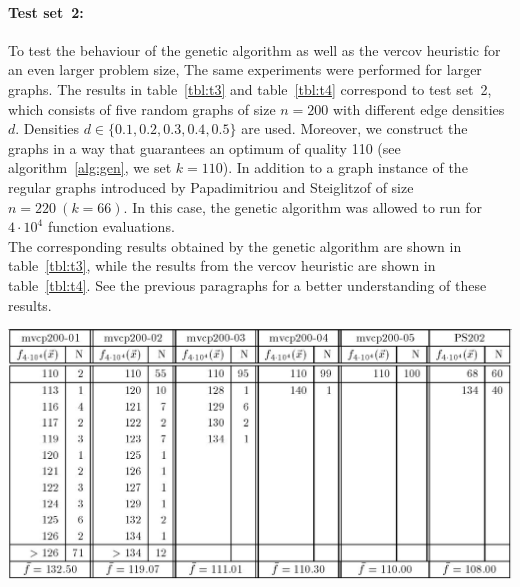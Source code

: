 \documentclass[12pt]{article}
\begin{document}
\paragraph{Test set~2:}
To test the behaviour of the genetic algorithm
as well as the vercov heuristic for an even
larger problem size, The same experiments
were performed for larger graphs.
The results in table~\ref{tbl:t3}
and table~\ref{tbl:t4} correspond to test set~2,
which consists of five random graphs of size
$n = 200$ with different edge densities $d$.
Densities $d \in \{0.1, 0.2, 0.3, 0.4, 0.5\}$ are used.
Moreover, we construct the graphs in a way that guarantees an optimum of quality 110
(see algorithm~\ref{alg:gen}, we set $k = 110$).
In addition to a graph instance of the regular graphs introduced by
Papadimitriou and Steiglitzof of size $n = 220 \ (k=66)$.
In this case, the genetic algorithm
was allowed to run for $4 \cdot 10^4$ function evaluations.\\
The corresponding results obtained by the
genetic algorithm are shown in table~\ref{tbl:t3}, while the results
from the vercov heuristic are shown in table~\ref{tbl:t4}.
See the previous paragraphs for a better understanding of these results.

\begin{table}[!htbp]
\centering
\includegraphics[width=1\textwidth]{t3}
\caption[Results obtained by GA for graphs in test set~2]{%
Experimental results obtained by the genetic algorithm for five random graphs of size $n = 200$ with edge density: $d = 0.1$ (``mvcp200-01''), $d = 0.2$ (``mvcp200-02''), $d = 0.3$ (``mvcp200-03''), $d = 0.5$ (``mvcp200-04''), $d = 0.5$ (``mvcp200-05'') and the regular graph of size $n = 202 \ (k=66)$ from Papadimitriou and Steiglitz (``PS202'').%
}
\label{tbl:t3}
\end{table}
\end{document}
